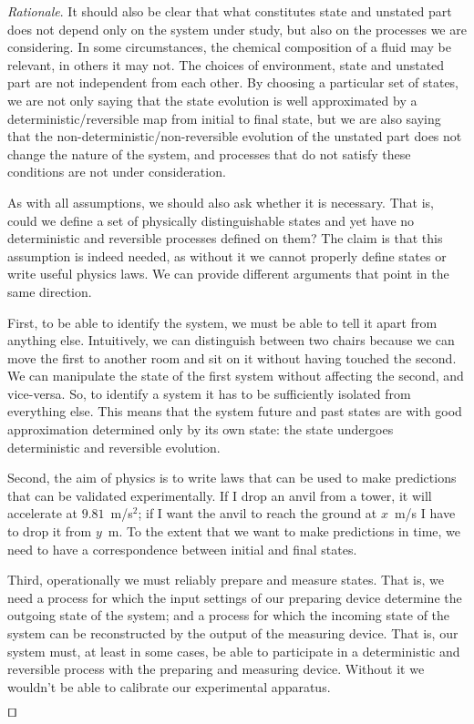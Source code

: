 \documentclass[smallextended]{svjour3}
\numberwithin{equation}{section}
\newenvironment{rationale}{\emph{Rationale}.}{\hfill\(\qed\)}
\theoremstyle{definition}
\newenvironment{rationale}{\emph{Rationale}.}{\qed}
\begin{document}
\begin{rationale}
It should also be clear that what constitutes state and unstated part does not depend only on the system under study, but also on the processes we are considering. In some circumstances, the chemical composition of a fluid may be relevant, in others it may not. The choices of environment, state and unstated part are not independent from each other. By choosing a particular set of states, we are not only saying that the state evolution is well approximated by a deterministic/reversible map from initial to final state, but we are also saying that the non-deterministic/non-reversible evolution of the unstated part does not change the nature of the system, and processes that do not satisfy these conditions are not under consideration.

As with all assumptions, we should also ask whether it is necessary. That is, could we define a set of physically distinguishable states and yet have no deterministic and reversible processes defined on them? The claim is that this assumption is indeed needed, as without it we cannot properly define states or write useful physics laws. We can provide different arguments that point in the same direction.

First, to be able to identify the system, we must be able to tell it apart from anything else. Intuitively, we can distinguish between two chairs because we can move the first to another room and sit on it without having touched the second. We can manipulate the state of the first system without affecting the second, and vice-versa. So, to identify a system it has to be sufficiently isolated from everything else. This means that the system future and past states are with good approximation determined only by its own state: the state undergoes deterministic and reversible evolution.

Second, the aim of physics is to write laws that can be used to make predictions that can be validated experimentally. If I drop an anvil from a tower, it will accelerate at $9.81$~m/s$^2$; if I want the anvil to reach the ground at $x$~m/s I have to drop it from $y$~m. To the extent that we want to make predictions in time, we need to have a correspondence between initial and final states.

Third, operationally we must reliably prepare and measure states. That is, we need a process for which the input settings of our preparing device determine the outgoing state of the system; and a process for which the incoming state of the system can be reconstructed by the output of the measuring device. That is, our system must, at least in some cases, be able to participate in a deterministic and reversible process with the preparing and measuring device. Without it we wouldn't be able to calibrate our experimental apparatus.


\end{rationale}
\end{document}
